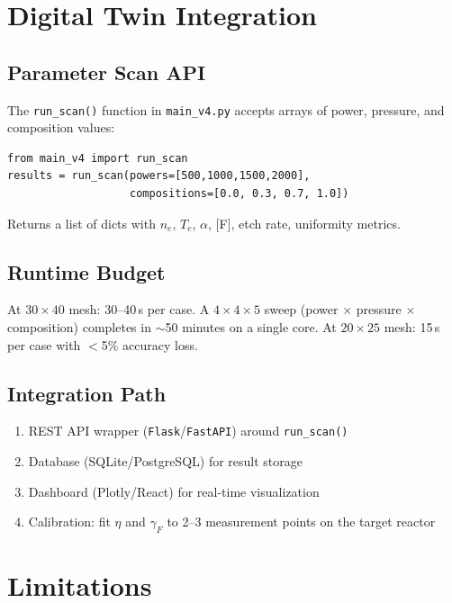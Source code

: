 \documentclass[11pt,a4paper]{article}
\renewcommand{\ne}{n_e}
\newcommand{\Te}{T_e}
\begin{document}
\section{Digital Twin Integration}
\label{sec:dt}

\subsection{Parameter Scan API}

The \texttt{run\_scan()} function in \texttt{main\_v4.py} accepts arrays of power, pressure, and composition values:
\begin{verbatim}
from main_v4 import run_scan
results = run_scan(powers=[500,1000,1500,2000],
                   compositions=[0.0, 0.3, 0.7, 1.0])
\end{verbatim}
Returns a list of dicts with $\ne$, $\Te$, $\alpha$, [F], etch rate, uniformity metrics.

\subsection{Runtime Budget}
At $30 \times 40$ mesh: 30--40\,s per case.  A $4 \times 4 \times 5$ sweep (power $\times$ pressure $\times$ composition) completes in $\sim$50 minutes on a single core.  At $20 \times 25$ mesh: 15\,s per case with $<$5\% accuracy loss.

\subsection{Integration Path}
\begin{enumerate}[nosep]
\item REST API wrapper (\texttt{Flask}/\texttt{FastAPI}) around \texttt{run\_scan()}
\item Database (SQLite/PostgreSQL) for result storage
\item Dashboard (Plotly/React) for real-time visualization
\item Calibration: fit $\eta$ and $\gamma_F$ to 2--3 measurement points on the target reactor
\end{enumerate}

\section{Limitations}
\label{sec:limits}
\end{document}
